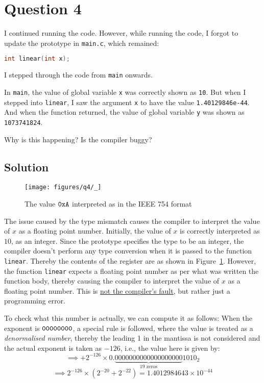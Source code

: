 \section*{Question 4}

I continued running the code.
However, while running the code, I forgot to update the prototype in \texttt{main.c}, which remained:
\begin{lstlisting}[language=C]
int linear(int x);
\end{lstlisting}

I stepped through the code from \texttt{main} onwards.

In \texttt{main}, the value of global variable \texttt{x} was correctly shown as \texttt{10}.
But when I stepped into \texttt{linear}, I saw the argument \texttt{x} to have the value \texttt{1.40129846e-44}.
And when the function returned, the value of global variable \texttt{y} was shown as \texttt{1073741824}.

Why is this happening?
Is the compiler buggy?

\subsection*{Solution}

\begin{figure*}[htbp]
    \centering
    \texttt{[image: figures/q4/\_]}
    \setlength{\abovecaptionskip}{-12pt}
    \caption{
        The value \( \texttt{0xA} \) interpreted as in the IEEE 754 format
    }\label{fig:q4}
\end{figure*}

The issue caused by the type mismatch causes the compiler to interpret the value of \( x \) as a floating point number.
Initially, the value of \( x \) is correctly interpreted as \( 10 \), as an integer.
Since the prototype specifies the type to be an integer, the compiler doesn't perform any type conversion when it is passed to the function \texttt{linear}.
Thereby the contents of the register are as shown in Figure~\ref{fig:q4}.
However, the function \texttt{linear} expects a floating point number as per what was written the function body, thereby causing the compiler to interpret the value of \( x \) as a floating point number.
This is \underline{not the compiler's fault}, but rather just a programming error.

To check what this number is actually, we can compute it as follows:
When the exponent is \( \texttt{00000000} \), a special rule is followed, where the value is treated as a \textit{denormalised number}, thereby the leading 1 in the mantissa is not considered and the actual exponent is taken as \( -126 \), i.e., the value here is given by:
\[
    \implies
    + 2^{ -126 } \times 0.\underbrace{0000000000000000000}_{19\text{ zeros}}1010_{2}
\]
\begin{equation*}
    \implies
    2^{ - 126 } \times (2^{-20} + 2^{-22})
    =
    1.4012984643 \times 10^{-44}
\end{equation*}

